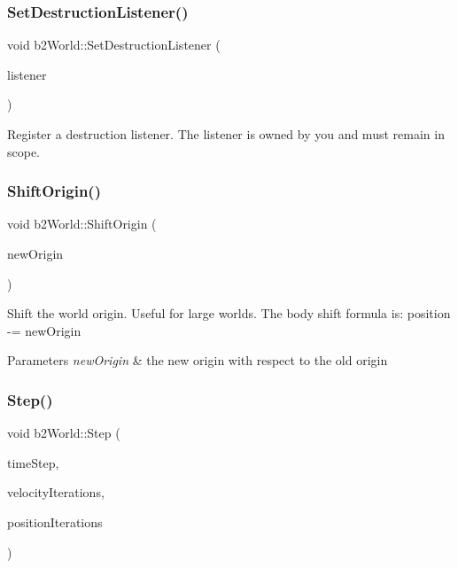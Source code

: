 \subsubsection{\texorpdfstring{Set\+Destruction\+Listener()}{SetDestructionListener()}}
{\footnotesize\ttfamily void b2\+World\+::\+Set\+Destruction\+Listener (\begin{DoxyParamCaption}\item[{\hyperlink{classb2_destruction_listener}{b2\+Destruction\+Listener} $\ast$}]{listener }\end{DoxyParamCaption})}

Register a destruction listener. The listener is owned by you and must remain in scope. \mbox{\label{classb2_world_afc33e20e64252c5be115216051408047}} 
\subsubsection{\texorpdfstring{Shift\+Origin()}{ShiftOrigin()}}
{\footnotesize\ttfamily void b2\+World\+::\+Shift\+Origin (\begin{DoxyParamCaption}\item[{const \hyperlink{structb2_vec2}{b2\+Vec2} \&}]{new\+Origin }\end{DoxyParamCaption})}

Shift the world origin. Useful for large worlds. The body shift formula is\+: position -\/= new\+Origin 
\begin{DoxyParams}{Parameters}
{\em new\+Origin} & the new origin with respect to the old origin \\
\hline
\end{DoxyParams}
\mbox{\label{classb2_world_a7a8eff61af98461f978fe43f3af7be90}} 
\subsubsection{\texorpdfstring{Step()}{Step()}}
{\footnotesize\ttfamily void b2\+World\+::\+Step (\begin{DoxyParamCaption}\item[{float32}]{time\+Step,  }\item[{int32}]{velocity\+Iterations,  }\item[{int32}]{position\+Iterations }\end{DoxyParamCaption})}

